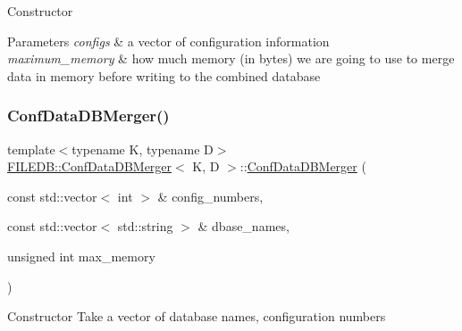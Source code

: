 Constructor 
\begin{DoxyParams}{Parameters}
{\em configs} & a vector of configuration information \\
\hline
{\em maximum\+\_\+memory} & how much memory (in bytes) we are going to use to merge data in memory before writing to the combined database \\
\hline
\end{DoxyParams}
\mbox{\label{classFILEDB_1_1ConfDataDBMerger_a495cdfd447f2ed64776d87601c36a05b}} 
\subsubsection{\texorpdfstring{ConfDataDBMerger()}{ConfDataDBMerger()}\hspace{0.1cm}{\footnotesize\ttfamily [4/6]}}
{\footnotesize\ttfamily template$<$typename K, typename D$>$ \\
\mbox{\hyperlink{classFILEDB_1_1ConfDataDBMerger}{F\+I\+L\+E\+D\+B\+::\+Conf\+Data\+D\+B\+Merger}}$<$ K, D $>$\+::\mbox{\hyperlink{classFILEDB_1_1ConfDataDBMerger}{Conf\+Data\+D\+B\+Merger}} (\begin{DoxyParamCaption}\item[{const std\+::vector$<$ int $>$ \&}]{config\+\_\+numbers,  }\item[{const std\+::vector$<$ std\+::string $>$ \&}]{dbase\+\_\+names,  }\item[{unsigned int}]{max\+\_\+memory }\end{DoxyParamCaption})\hspace{0.3cm}{\ttfamily [inline]}}

Constructor Take a vector of database names, configuration numbers \mbox{\label{classFILEDB_1_1ConfDataDBMerger_a1592d55d089ad7ead813ab8d2b955e09}} 
